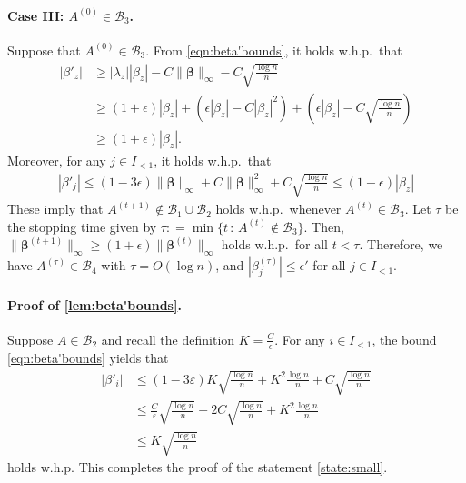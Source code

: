 \documentclass[letterpaper,11pt]{article}
\def\defeq{\mathrel{\mathop:}=}%
\begin{document}
\paragraph*{Case I\hspace{-.1em}I\hspace{-.1em}I: $A^{(0)}\in\mathcal{B}_3$.}
Suppose that $A^{(0)}\in \mathcal{B}_3$.
From \cref{eqn:beta'bounds}, it holds w.h.p.~that
\begin{align*}
|\beta'_z|&\geq |\lambda_z||\beta_z|-C\|{\boldsymbol \beta}\|_\infty - C\sqrt{\frac{\log n}{n}} \\
&\geq (1+\epsilon)|\beta_z| + (\epsilon|\beta_z|-C|\beta_z|^2)+\left(\epsilon|\beta_z|-C\sqrt{\frac{\log n}{n}}\right) \\
&\geq (1+\epsilon)|\beta_z|.
\end{align*}
Moreover, for any $j\in I_{<1}$, it holds w.h.p.~that
\begin{align*}
|\beta'_j| \leq (1-3\epsilon)\|{\boldsymbol \beta}\|_\infty + C\|{\boldsymbol \beta}\|^2_{\infty} + C\sqrt{\frac{\log n}{n}}
\leq (1-\epsilon)|\beta_z|
\end{align*}
These imply that $A^{(t+1)}\not\in\mathcal{B}_1 \cup \mathcal{B}_2$ holds w.h.p.~whenever $A^{(t)}\in \mathcal{B}_3$.
Let $\tau$ be the stopping time given by $\tau \defeq \min\{t\,:\,A^{(t)}\not\in \mathcal{B}_3\}$.
Then, $\|{\boldsymbol \beta}^{(t+1)}\|_\infty \geq (1+\epsilon)\|{\boldsymbol \beta}^{(t)}\|_\infty $ holds w.h.p.~for all $t<\tau$.
Therefore, we have $A^{(\tau)}\in\mathcal{B}_4$ with $\tau=O(\log n)$, and $|\beta^{(\tau)}_j|\leq \epsilon'$ for all $j\in I_{<1}$.


\paragraph*{Proof of \cref{lem:beta'bounds}.}
Suppose $A\in\mathcal{B}_2$ and recall the definition $K=\frac{C}{\epsilon}$.
For any $i\in I_{<1}$, the bound \cref{eqn:beta'bounds} yields that
\begin{align*}
|\beta'_i|&\leq (1-3\varepsilon)K\sqrt{\frac{\log n}{n}}+K^2\frac{\log n}{n}+ C\sqrt{\frac{\log n}{n}} \\
&\leq \frac{C}{\varepsilon}\sqrt{\frac{\log n}{n}} - 2C\sqrt{\frac{\log n}{n}} + K^2\frac{\log n}{n} \\
&\leq K\sqrt{\frac{\log n}{n}}
\end{align*}
holds w.h.p.
This completes the proof of the statement \ref{state:small}.
\end{document}
